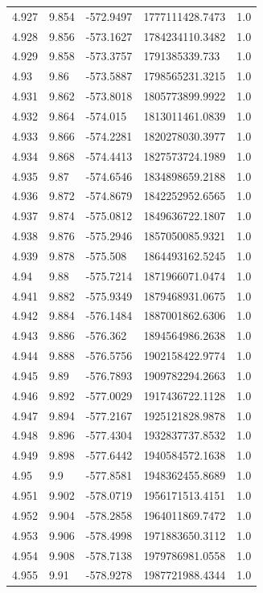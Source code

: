 \begin{tabular}{lllll}
4.927 & 9.854 & -572.9497 & 1777111428.7473 & 1.0 \\
4.928 & 9.856 & -573.1627 & 1784234110.3482 & 1.0 \\
4.929 & 9.858 & -573.3757 & 1791385339.733 & 1.0 \\
4.93 & 9.86 & -573.5887 & 1798565231.3215 & 1.0 \\
4.931 & 9.862 & -573.8018 & 1805773899.9922 & 1.0 \\
4.932 & 9.864 & -574.015 & 1813011461.0839 & 1.0 \\
4.933 & 9.866 & -574.2281 & 1820278030.3977 & 1.0 \\
4.934 & 9.868 & -574.4413 & 1827573724.1989 & 1.0 \\
4.935 & 9.87 & -574.6546 & 1834898659.2188 & 1.0 \\
4.936 & 9.872 & -574.8679 & 1842252952.6565 & 1.0 \\
4.937 & 9.874 & -575.0812 & 1849636722.1807 & 1.0 \\
4.938 & 9.876 & -575.2946 & 1857050085.9321 & 1.0 \\
4.939 & 9.878 & -575.508 & 1864493162.5245 & 1.0 \\
4.94 & 9.88 & -575.7214 & 1871966071.0474 & 1.0 \\
4.941 & 9.882 & -575.9349 & 1879468931.0675 & 1.0 \\
4.942 & 9.884 & -576.1484 & 1887001862.6306 & 1.0 \\
4.943 & 9.886 & -576.362 & 1894564986.2638 & 1.0 \\
4.944 & 9.888 & -576.5756 & 1902158422.9774 & 1.0 \\
4.945 & 9.89 & -576.7893 & 1909782294.2663 & 1.0 \\
4.946 & 9.892 & -577.0029 & 1917436722.1128 & 1.0 \\
4.947 & 9.894 & -577.2167 & 1925121828.9878 & 1.0 \\
4.948 & 9.896 & -577.4304 & 1932837737.8532 & 1.0 \\
4.949 & 9.898 & -577.6442 & 1940584572.1638 & 1.0 \\
4.95 & 9.9 & -577.8581 & 1948362455.8689 & 1.0 \\
4.951 & 9.902 & -578.0719 & 1956171513.4151 & 1.0 \\
4.952 & 9.904 & -578.2858 & 1964011869.7472 & 1.0 \\
4.953 & 9.906 & -578.4998 & 1971883650.3112 & 1.0 \\
4.954 & 9.908 & -578.7138 & 1979786981.0558 & 1.0 \\
4.955 & 9.91 & -578.9278 & 1987721988.4344 & 1.0 \\

\end{tabular}
